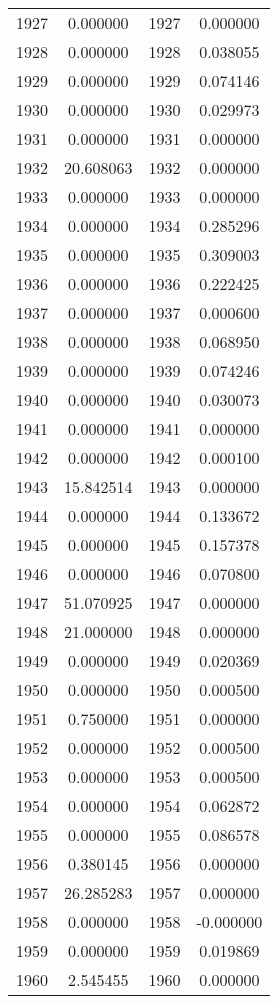 \documentclass[12pt]{article}
\begin{document}
\begin{longtable}{@{}cccc@{}}
1927 & 0.000000 & 1927 & 0.000000 \\
1928 & 0.000000 & 1928 & 0.038055 \\
1929 & 0.000000 & 1929 & 0.074146 \\
1930 & 0.000000 & 1930 & 0.029973 \\
1931 & 0.000000 & 1931 & 0.000000 \\
1932 & 20.608063 & 1932 & 0.000000 \\
1933 & 0.000000 & 1933 & 0.000000 \\
1934 & 0.000000 & 1934 & 0.285296 \\
1935 & 0.000000 & 1935 & 0.309003 \\
1936 & 0.000000 & 1936 & 0.222425 \\
1937 & 0.000000 & 1937 & 0.000600 \\
1938 & 0.000000 & 1938 & 0.068950 \\
1939 & 0.000000 & 1939 & 0.074246 \\
1940 & 0.000000 & 1940 & 0.030073 \\
1941 & 0.000000 & 1941 & 0.000000 \\
1942 & 0.000000 & 1942 & 0.000100 \\
1943 & 15.842514 & 1943 & 0.000000 \\
1944 & 0.000000 & 1944 & 0.133672 \\
1945 & 0.000000 & 1945 & 0.157378 \\
1946 & 0.000000 & 1946 & 0.070800 \\
1947 & 51.070925 & 1947 & 0.000000 \\
1948 & 21.000000 & 1948 & 0.000000 \\
1949 & 0.000000 & 1949 & 0.020369 \\
1950 & 0.000000 & 1950 & 0.000500 \\
1951 & 0.750000 & 1951 & 0.000000 \\
1952 & 0.000000 & 1952 & 0.000500 \\
1953 & 0.000000 & 1953 & 0.000500 \\
1954 & 0.000000 & 1954 & 0.062872 \\
1955 & 0.000000 & 1955 & 0.086578 \\
1956 & 0.380145 & 1956 & 0.000000 \\
1957 & 26.285283 & 1957 & 0.000000 \\
1958 & 0.000000 & 1958 & -0.000000 \\
1959 & 0.000000 & 1959 & 0.019869 \\
1960 & 2.545455 & 1960 & 0.000000 \\

\end{longtable}
\end{document}
